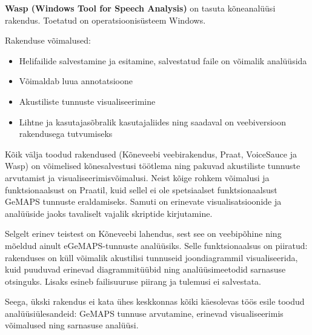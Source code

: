 \textbf{Wasp (Windows Tool for Speech Analysis)} \cite{wasp} on tasuta kõneanalüüsi rakendus. Toetatud on operatsioonisüsteem Windows.

Rakenduse võimalused:
\begin{itemize}
    \item Helifailide salvestamine ja esitamine, salvestatud faile on võimalik analüüsida
    \item Võimaldab luua annotatsioone
    \item Akustiliste tunnuste visualiseerimine
    \item Lihtne ja kasutajasõbralik kasutajaliides ning saadaval on veebiversioon rakendusega tutvumiseks
\end{itemize} 

Kõik välja toodud rakendused (Kõneveebi veebirakendus, Praat, VoiceSauce ja Wasp) on võimelised kõnesalvestusi töötlema ning pakuvad akustiliste tunnuste arvutamist ja visualiseerimisvõimalusi. Neist kõige rohkem võimalusi ja funktsionaalsust on Praatil, kuid sellel ei ole spetsiaalset funktsionaalsust GeMAPS tunnuste eraldamiseks. Samuti on erinevate visualisatsioonide ja analüüside jaoks tavaliselt vajalik skriptide kirjutamine.

Selgelt erinev teistest on Kõneveebi lahendus, sest see on veebipõhine ning mõeldud ainult eGeMAPS-tunnuste analüüsiks. Selle funktsionaalsus on piiratud: rakenduses on küll võimalik akustilisi tunnuseid joondiagrammil visualiseerida, kuid puuduvad erinevad diagrammitüübid ning analüüsimeetodid sarnasuse otsinguks. Lisaks esineb failisuuruse piirang ja tulemusi ei salvestata.

Seega, ükski rakendus ei kata ühes keskkonnas kõiki käesolevas töös esile toodud analüüsiülesandeid: GeMAPS tunnuse arvutamine, erinevad visualiseerimis võimalused ning sarnasuse analüüsi.
